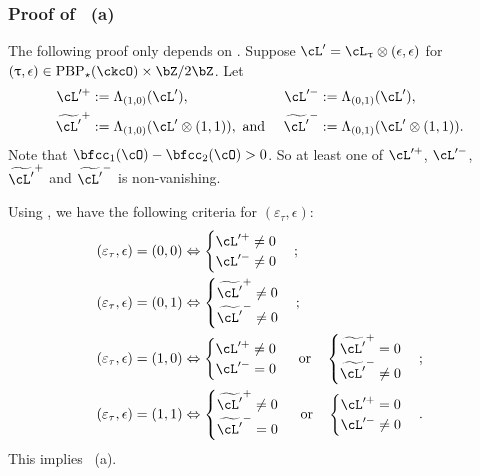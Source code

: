 \documentclass[12pt,a4paper]{amsart}
\numberwithin{equation}{section}
\theoremstyle{remark}
\def\PBP{\mathrm{PBP}}
\begin{document}
\subsubsection*{ Proof of ~(a) }
\def\opac{\cL'^+}
\def\onac{\cL'^-}
\def\tpac{\widetilde{\cL'}^+}
\def\tnac{\widetilde{\cL'}^-}
The following proof only depends on .
Suppose $\cL' = \ac_{\uptau}\lotimes (\epsilon,\epsilon)$ for $(\uptau,\epsilon)\in \PBP_\star(\ckcO)\times \bZ/2\bZ$.
Let
  \begin{align*}
    \opac &:= \Lambda_{(1,0)}(\cL'), &
    \onac &:= \Lambda_{(0,1)}(\cL'), \\
    \tpac &:= \Lambda_{(1,0)}(\cL'\lotimes (1,1)),\text{ and } &
    \tnac &:= \Lambda_{(0,1)}(\cL'\lotimes (1,1)).
  \end{align*}
Note that $\bfcc_{1}(\cO)-\bfcc_{2}(\cO)>0$. So at least one of $\opac$,
$\onac$, $\tpac$ and $\tnac$ is non-vanishing.

Using , we
have the following criteria for $(\varepsilon_{\tau},\epsilon)$:
\[
\begin{split}
  (\varepsilon_{\tau},\epsilon) = (0,0) & \Leftrightarrow
  \begin{cases} \opac \neq 0\\ \onac \neq 0 \end{cases};\\
  (\varepsilon_{\tau},\epsilon) = (0,1) & \Leftrightarrow
  \begin{cases} \tpac \neq 0\\ \tnac \neq 0 \end{cases};\\
  (\varepsilon_{\tau},\epsilon) = (1,0) & \Leftrightarrow
  \begin{cases} \opac \neq 0 \\ \onac  = 0 \end{cases} \text{ or} \quad
  \begin{cases} \tpac = 0 \\ \tnac  \neq 0 \end{cases}; \\
  (\varepsilon_{\tau},\epsilon) = (1,1) & \Leftrightarrow
  \begin{cases} \tpac \neq 0 \\ \tnac  = 0 \end{cases} \text{ or} \quad
  \begin{cases} \opac = 0 \\ \onac  \neq 0 \end{cases}.
\end{split}
\]
This implies ~(a).
\end{document}
